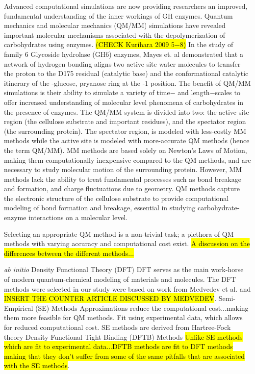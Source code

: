 \documentclass{article}
\begin{document}
Advanced computational simulations are now providing researchers an improved, fundamental understanding of the inner workings of GH enzymes.
Quantum mechanics and molecular mechanics (QM/MM) simulations have revealed important molecular mechanisms associated with the depolymerization 
of carbohydrates using enzymes.\cite{Mayes2014a} \hl{(CHECK Kurihara 2009 5$-$8)}	
In the study of family 6 Glycoside hydrolase (GH6) enzymes, Mayes et. al demonstrated that a network of hydrogen 
bonding aligns two active site water molecules to transfer the proton to the D175 residual (catalytic base) and the 
conformational catalytic itinerary of the \textbeta-glucose, pryanose ring at the -1 position.\cite{Mayes2014a} 
The benefit of QM/MM simulations is their ability to simulate a variety of time$-$ and length$-$scales 
to offer increased understanding of molecular level phenomena of carbohydrates in the presence of enzymes. 
The QM/MM system is divided into two: the active site region (the cellulose substrate and important residues), and the spectator region 
(the surrounding protein). The spectator region, is modeled with less-costly MM methods while the active site
is modeled with more-accurate QM methods (hence the term QM/MM). MM methods are based solely on Newton's Laws of Motion, making them 
computationally inexpensive compared to the QM methods, and are necessary to study molecular motion of the surrounding protein. 
However, MM methods lack the ability to treat fundamental processes such as bond breakage and formation, and charge fluctuations due to 
geometry.\cite{Seabra2007} QM methods capture the electronic structure of the cellulose substrate to provide computational modeling of 
bond formation and breakage, essential in studying carbohydrate-enzyme interactions on a molecular level.

 Selecting an appropriate QM method is a non-trivial task; a plethora of QM methods with varying accuracy and computational cost exist. 
 \hl{A discussion on the differences between the different methods...} 
 \begin{outline}[enumerate]
	\1 \textit{ab initio}
	\1 Density Functional Theory (DFT)
		\2 DFT serves as the main work-horse of modern quantum-chemical modeling of materials and 
		molecules.\cite{Medvedev2017}  The DFT methods were selected in our study were based on work from Medvedev et al.
		and \hl{INSERT THE COUNTER ARTICLE DISCUSSED BY MEDVEDEV}.
	\1 Semi-Empirical (SE) Methods 
		\2  Approximations reduce the computational cost...making them more feasible for QM methods. Fit using experimental data, which allows 
		for reduced computational cost. 
		\2 SE methods are derived from Hartree-Fock theory
	\1 Density Functional Tight Binding (DFTB) Methods
		\2 \hl{Unlike SE methods which are fit to experimental data...DFTB methods are fit to DFT methods making that they don't suffer from some of the same 
		pitfalls that are associated with the SE methods}. 
\end{outline}
\end{document}
